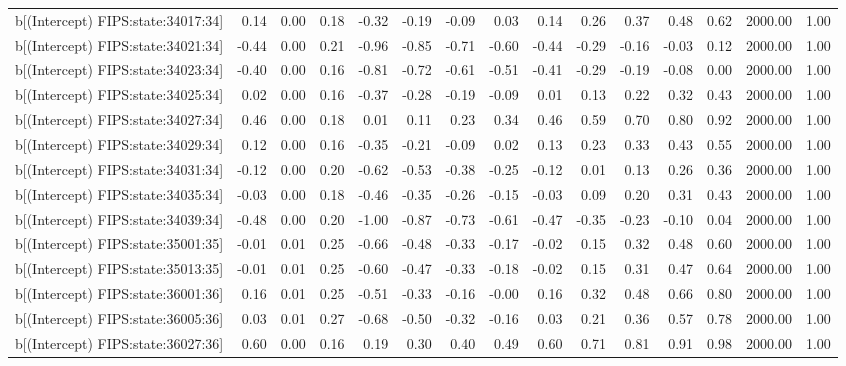 \begin{table}[ht]
\begin{tabular}{rrrrrrrrrrrrrrr}
  b[(Intercept) FIPS:state:34017:34] & 0.14 & 0.00 & 0.18 & -0.32 & -0.19 & -0.09 & 0.03 & 0.14 & 0.26 & 0.37 & 0.48 & 0.62 & 2000.00 & 1.00 \\ 
  b[(Intercept) FIPS:state:34021:34] & -0.44 & 0.00 & 0.21 & -0.96 & -0.85 & -0.71 & -0.60 & -0.44 & -0.29 & -0.16 & -0.03 & 0.12 & 2000.00 & 1.00 \\ 
  b[(Intercept) FIPS:state:34023:34] & -0.40 & 0.00 & 0.16 & -0.81 & -0.72 & -0.61 & -0.51 & -0.41 & -0.29 & -0.19 & -0.08 & 0.00 & 2000.00 & 1.00 \\ 
  b[(Intercept) FIPS:state:34025:34] & 0.02 & 0.00 & 0.16 & -0.37 & -0.28 & -0.19 & -0.09 & 0.01 & 0.13 & 0.22 & 0.32 & 0.43 & 2000.00 & 1.00 \\ 
  b[(Intercept) FIPS:state:34027:34] & 0.46 & 0.00 & 0.18 & 0.01 & 0.11 & 0.23 & 0.34 & 0.46 & 0.59 & 0.70 & 0.80 & 0.92 & 2000.00 & 1.00 \\ 
  b[(Intercept) FIPS:state:34029:34] & 0.12 & 0.00 & 0.16 & -0.35 & -0.21 & -0.09 & 0.02 & 0.13 & 0.23 & 0.33 & 0.43 & 0.55 & 2000.00 & 1.00 \\ 
  b[(Intercept) FIPS:state:34031:34] & -0.12 & 0.00 & 0.20 & -0.62 & -0.53 & -0.38 & -0.25 & -0.12 & 0.01 & 0.13 & 0.26 & 0.36 & 2000.00 & 1.00 \\ 
  b[(Intercept) FIPS:state:34035:34] & -0.03 & 0.00 & 0.18 & -0.46 & -0.35 & -0.26 & -0.15 & -0.03 & 0.09 & 0.20 & 0.31 & 0.43 & 2000.00 & 1.00 \\ 
  b[(Intercept) FIPS:state:34039:34] & -0.48 & 0.00 & 0.20 & -1.00 & -0.87 & -0.73 & -0.61 & -0.47 & -0.35 & -0.23 & -0.10 & 0.04 & 2000.00 & 1.00 \\ 
  b[(Intercept) FIPS:state:35001:35] & -0.01 & 0.01 & 0.25 & -0.66 & -0.48 & -0.33 & -0.17 & -0.02 & 0.15 & 0.32 & 0.48 & 0.60 & 2000.00 & 1.00 \\ 
  b[(Intercept) FIPS:state:35013:35] & -0.01 & 0.01 & 0.25 & -0.60 & -0.47 & -0.33 & -0.18 & -0.02 & 0.15 & 0.31 & 0.47 & 0.64 & 2000.00 & 1.00 \\ 
  b[(Intercept) FIPS:state:36001:36] & 0.16 & 0.01 & 0.25 & -0.51 & -0.33 & -0.16 & -0.00 & 0.16 & 0.32 & 0.48 & 0.66 & 0.80 & 2000.00 & 1.00 \\ 
  b[(Intercept) FIPS:state:36005:36] & 0.03 & 0.01 & 0.27 & -0.68 & -0.50 & -0.32 & -0.16 & 0.03 & 0.21 & 0.36 & 0.57 & 0.78 & 2000.00 & 1.00 \\ 
  b[(Intercept) FIPS:state:36027:36] & 0.60 & 0.00 & 0.16 & 0.19 & 0.30 & 0.40 & 0.49 & 0.60 & 0.71 & 0.81 & 0.91 & 0.98 & 2000.00 & 1.00 \\ 

\end{tabular}
\end{table}
